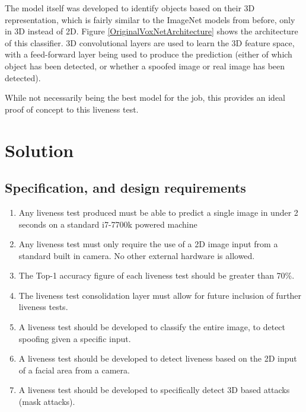 \documentclass[12pt,a4paper]{article}
\begin{document}
            The model itself was developed to identify objects based on their 3D representation, which is fairly similar to the ImageNet models from before, only in 3D instead of 2D. 
            Figure \ref{OriginalVoxNetArchitecture} shows the architecture of this classifier. 3D convolutional layers are used to learn the 3D feature space, with a feed-forward layer
            being used to produce the prediction (either of which object has been detected, or whether a spoofed image or real image has been detected).

            While not necessarily being the best model for the job, this provides an ideal proof of concept to this liveness test.
             

\section{Solution}
    \subsection{Specification, and design requirements}
        \begin{enumerate}
            \item \label{SpecPoint1} Any liveness test produced must be able to predict a single image in under 2 seconds on a standard i7-7700k powered machine
            \item \label{SpecPoint2} Any liveness test must only require the use of a 2D image input from a standard built in camera. No other external hardware is allowed.
            \item \label{SpecPoint3} The Top-1 accuracy figure of each liveness test should be greater than 70\%.
            \item \label{SpecPoint4} The liveness test consolidation layer must allow for future inclusion of further liveness tests.
            \item \label{SpecPoint5} A liveness test should be developed to classify the entire image, to detect spoofing given a specific input.
            \item \label{SpecPoint6} A liveness test should be developed to detect liveness based on the 2D input of a facial area from a camera.
            \item \label{SpecPoint7} A liveness test should be developed to specifically detect 3D based attacks (mask attacks).
        \end{enumerate}
\end{document}
